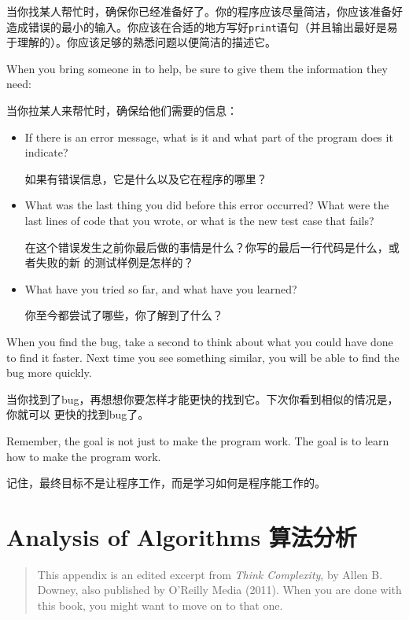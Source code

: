 \documentclass[10pt]{book}
\begin{document}
\begin{CJK}{UTF8}{gbsn}
当你找某人帮忙时，确保你已经准备好了。你的程序应该尽量简洁，你应该准备好造成错误的最小的输入。你应该在合适的地方写好{\tt print}语句（并且输出最好是易于理解的）。你应该足够的熟悉问题以便简洁的描述它。

When you bring someone in to help, be sure to give
them the information they need:

当你拉某人来帮忙时，确保给他们需要的信息：

\begin{itemize}

\item If there is an error message, what is it
and what part of the program does it indicate?

如果有错误信息，它是什么以及它在程序的哪里？

\item What was the last thing you did before this error occurred?
What were the last lines of code that you wrote, or what is
the new test case that fails?

在这个错误发生之前你最后做的事情是什么？你写的最后一行代码是什么，或者失败的新
的测试样例是怎样的？

\item What have you tried so far, and what have you learned?

    你至今都尝试了哪些，你了解到了什么？

\end{itemize}

When you find the bug, take a second to think about what you
could have done to find it faster.  Next time you see something
similar, you will be able to find the bug more quickly.

当你找到了bug，再想想你要怎样才能更快的找到它。下次你看到相似的情况是，你就可以
更快的找到bug了。

Remember, the goal is not just to make the program
work.  The goal is to learn how to make the program work.

记住，最终目标不是让程序工作，而是学习如何是程序能工作的。


\chapter{Analysis of Algorithms 算法分析}

\begin{quote}
This appendix is an edited excerpt from {\it Think Complexity}, by
Allen B. Downey, also published by O'Reilly Media (2011).  When you
are done with this book, you might want to move on to that one.


\end{quote}
\end{CJK}
\end{document}
